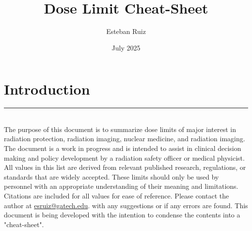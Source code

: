 \documentclass{article}
\title{Dose Limit Cheat-Sheet}
\author{Esteban Ruiz}
\date{July 2025}
\begin{document}
\newcommand{\printGroupTable}[1]{%
\noindent
  \begin{tabular}{m{4.5cm} m{1.3cm} {0.9cm}} %
    \toprule
    Effect & Value & Source \\
    \midrule
    \DTLforeach*{mydata}{%
      \Group=Group, \Effect=Effect, \Value=Value, \Source=Source%
    }{%
      \ifthenelse{\equal{\Group}{#1}}{%
        \Effect & \Value & \Source \\
      }{}%
    }
  \end{tabular}%
}

\newcommand{\printNucTable}[1]{%
\noindent
  \begin{tabular}{m{4.5cm} m{1.3cm} {0.9cm}} %
    \toprule
    Limit & Value & Source \\
    \midrule
    \DTLforeach*{mydata}{%
      \Group=Group, \Regulation=Effect, \Value=Value, \Source=Source%
    }{%
      \ifthenelse{\equal{\Group}{#1}}{%
        \Regulation & \Value & \Source \\
      }{}%
    }
  \end{tabular}%
}



\maketitle

\section*{Introduction}

\noindent\rule{\linewidth}{0.4pt} \\
 
 The purpose of this document is to summarize dose limits of major interest in radiation protection, radiation imaging, nuclear medicine, and radiation imaging. The document is a work in progress and is intended to assist in clinical decision making and policy development by a radiation safety officer or medical physicist. All values in this list are derived from relevant published research, regulations, or standards that are widely accepted. These limits should only be used by personnel with an appropriate understanding of their meaning and limitations. Citations are included for all values for ease of reference. Please contact the author at \hyperref[]{esruiz@gatech.edu}. with any suggestions or if any errors are found. This document is being developed with the intention to condense the contents into a "cheat-sheet".
\end{document}
